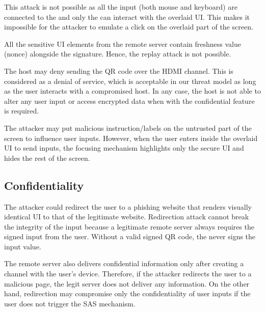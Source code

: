  This attack is not possible as all the input (both mouse and keyboard) are connected to the \device and only the \device can interact with the overlaid UI. This makes it impossible for the attacker to emulate a click on the overlaid part of the screen.  

 All the sensitive UI elements from the remote server contain freshness value (nonce) alongside the signature. Hence, the replay attack is not possible.

 The host may deny sending the QR code over the HDMI channel. This is considered as a denial of service, which is acceptable in our threat model as long as the user interacts with a compromised host. 
In any case, the host is not able to alter any user input or access encrypted data when \name with the confidential feature is required.

 The attacker may put malicious instruction/labels on the untrusted part of the screen to influence user inputs. However, when the user enters inside the overlaid UI to send inputs, the focusing mechanism highlights only the secure UI and hides the rest of the screen. 

\subsection{Confidentiality}

 The attacker could redirect the user to a phishing website that renders visually identical UI to that of the legitimate website. Redirection attack cannot break the integrity of the input because a legitimate remote server always requires the signed input from the user. Without a valid signed QR code, the \device never signs the input value. 

The remote server also delivers confidential information only after creating a \tls channel with the user's device. Therefore, if the attacker redirects the user to a malicious page, the legit server does not deliver any information. On the other hand, redirection may compromise only the confidentiality of user inputs if the user does not trigger the SAS mechanism. 

